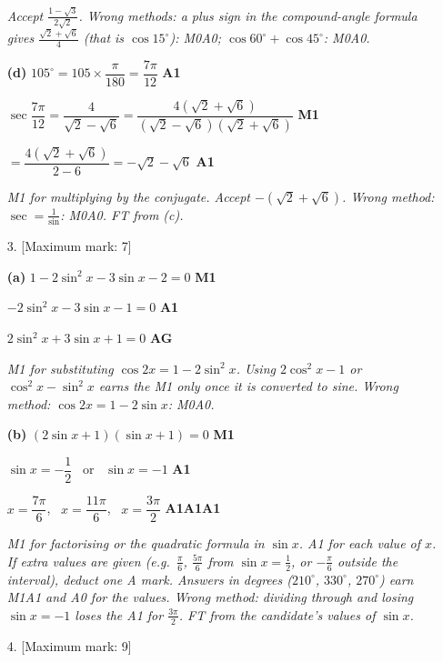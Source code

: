 \documentclass[12pt, twoside]{article}
\begin{document}
\begin{enumerate}[itemsep=0.3cm]
\emph{Accept $\frac{1 - \sqrt{3}}{2\sqrt{2}}$. Wrong methods: a plus sign in
the compound-angle formula gives $\frac{\sqrt{2} + \sqrt{6}}{4}$ (that is
$\cos 15^\circ$): M0A0; $\cos 60^\circ + \cos 45^\circ$: M0A0.}

\textbf{(d)} $105^\circ = 105 \times \dfrac{\pi}{180} = \dfrac{7\pi}{12}$
\hfill \textbf{A1}

$\sec\dfrac{7\pi}{12} = \dfrac{4}{\sqrt{2} - \sqrt{6}}
= \dfrac{4(\sqrt{2} + \sqrt{6})}{(\sqrt{2} - \sqrt{6})(\sqrt{2} + \sqrt{6})}$
\hfill \textbf{M1}

$= \dfrac{4(\sqrt{2} + \sqrt{6})}{2 - 6} = -\sqrt{2} - \sqrt{6}$
\hfill \textbf{A1}

\emph{M1 for multiplying by the conjugate. Accept $-(\sqrt{2} + \sqrt{6})$.
Wrong method: $\sec = \frac{1}{\sin}$: M0A0. FT from (c).}

\newpage

\item[3.] [Maximum mark: 7]

\textbf{(a)} $1 - 2\sin^{2}x - 3\sin x - 2 = 0$ \hfill \textbf{M1}

$-2\sin^{2}x - 3\sin x - 1 = 0$ \hfill \textbf{A1}

$2\sin^{2}x + 3\sin x + 1 = 0$ \hfill \textbf{AG}

\emph{M1 for substituting $\cos 2x = 1 - 2\sin^{2}x$. Using
$2\cos^{2}x - 1$ or $\cos^{2}x - \sin^{2}x$ earns the M1 only once it is
converted to sine. Wrong method: $\cos 2x = 1 - 2\sin x$: M0A0.}

\textbf{(b)} $(2\sin x + 1)(\sin x + 1) = 0$ \hfill \textbf{M1}

$\sin x = -\dfrac{1}{2}$ \ or \ $\sin x = -1$ \hfill \textbf{A1}

$x = \dfrac{7\pi}{6}$, \ $x = \dfrac{11\pi}{6}$, \ $x = \dfrac{3\pi}{2}$
\hfill \textbf{A1A1A1}

\emph{M1 for factorising or the quadratic formula in $\sin x$. A1 for each
value of $x$. If extra values are given (e.g.\ $\frac{\pi}{6}$,
$\frac{5\pi}{6}$ from $\sin x = \frac{1}{2}$, or $-\frac{\pi}{6}$ outside
the interval), deduct one A mark. Answers in degrees ($210^\circ$,
$330^\circ$, $270^\circ$) earn M1A1 and A0 for the values. Wrong method:
dividing through and losing $\sin x = -1$ loses the A1 for
$\frac{3\pi}{2}$. FT from the candidate's values of $\sin x$.}

\newpage

\item[4.] [Maximum mark: 9]


\end{enumerate}
\end{document}
